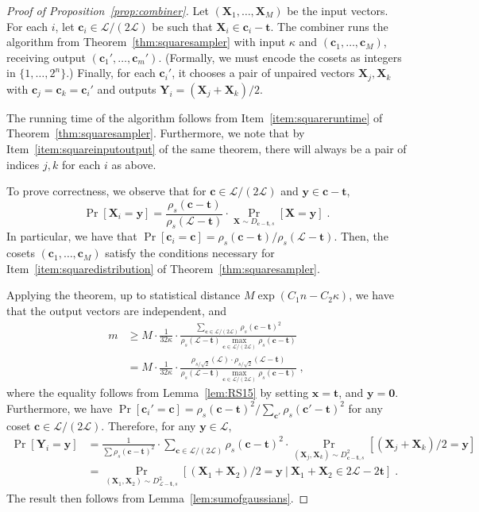 \documentclass[11pt]{article}
\renewcommand{\vec}[1]{\ensuremath{\mathbf{#1}}}
\newcommand{\coset}{\ensuremath{\vec{c}}}
\newcommand{\lat}{\mathcal{L}}
\begin{document}
\begin{proof}[Proof of Proposition~\ref{prop:combiner}]
Let $(\vec{X}_1, \ldots, \vec{X}_M)$ be the input vectors. 
For each $i$, let $\coset_i \in \lat/(2\lat)$ be such that $\vec{X}_i \in \coset_i - \vec{t}$. The combiner runs the algorithm from Theorem~\ref{thm:squaresampler} with input $\kappa$
and $(\coset_1,\ldots,\coset_M)$,
receiving output $(\coset_1', \ldots, \coset_m')$. 
(Formally, we must encode the cosets as integers in $\{1,\ldots, 2^n\}$.) Finally, for each $\coset_i'$, it chooses a pair of unpaired vectors $\vec{X}_j, \vec{X}_k$ with 
$\coset_j = \coset_k = \coset_i'$ and outputs $\vec{Y}_i = (\vec{X}_j + \vec{X}_k)/2$.

The running time of the algorithm follows from Item~\ref{item:squareruntime} of Theorem~\ref{thm:squaresampler}. Furthermore, we note that by Item~\ref{item:squareinputoutput} of the same theorem, there will always be a pair of indices $j,k$ for each $i$ as above.

To prove correctness, we observe that for $\coset \in \lat/(2\lat)$ and $\vec{y} \in \coset - \vec{t}$, 
\[ 
\Pr[\vec{X}_i = \vec{y}] = \frac{\rho_s(\coset - \vec{t})}{\rho_s(\lat - \vec{t})} \cdot \Pr_{\vec{X} \sim D_{\coset - \vec{t},s}}[\vec{X} = \vec{y}] \;.
\]
In particular, we have that $\Pr[\coset_i = \coset] = \rho_s(\coset-\vec{t})/\rho_s(\lat - \vec{t})$. 
Then, the cosets $(\coset_1,\ldots,\coset_M)$ satisfy the conditions necessary for Item~\ref{item:squaredistribution} of Theorem~\ref{thm:squaresampler}. 

Applying the theorem, up to statistical distance $M \exp(C_1 n - C_2 \kappa)$, we have that the output vectors are independent, and
\begin{align*}
m 
&\geq M \cdot \frac{1}{32\kappa }\cdot\frac{\sum_{\coset \in \lat/(2\lat)}\rho_s(\coset-\vec{t})^2}{\rho_s(\lat-\vec{t})\max_{\coset \in \lat / (2\lat)} \rho_s(\coset - \vec{t})} \\
&= M \cdot \frac{1}{32\kappa}\cdot\frac{\rho_{s/\sqrt{2}}(\lat) \cdot \rho_{s/\sqrt{2}}(\lat - \vec{t})}{ \rho_s(\lat-\vec{t})\max_{\coset \in \lat / (2\lat)} \rho_s(\coset - \vec{t})}
\; ,
\end{align*}
where the equality follows from Lemma~\ref{lem:RS15} by setting $\vec{x} = \vec{t}$, and $\vec{y} = \vec{0}$.
 Furthermore, we have $\Pr[\coset_i' = \coset] = \rho_s(\coset-\vec{t})^2/\sum_{\coset'} \rho_s(\coset' - \vec{t})^2$ for any coset $\coset \in \lat/(2\lat)$. Therefore, for any $\vec{y} \in \lat$, 
\begin{align*}
\Pr[\vec{Y}_i = \vec{y}] &= \frac{1}{\sum \rho_s(\coset - \vec{t})^2} \cdot \sum_{\coset \in \lat/(2\lat)} \rho_s(\coset-\vec{t})^2 \cdot \Pr_{(\vec{X}_j, \vec{X}_k) \sim D_{\coset-\vec{t}, s}^2}[(\vec{X}_j + \vec{X}_k)/2  = \vec{y}]\\
&= \Pr_{(\vec{X}_1, \vec{X}_2) \sim D_{\lat-\vec{t}, s}^2}[(\vec{X}_1 + \vec{X}_2)/2 = \vec{y} ~|~ \vec{X}_1 + \vec{X}_2 \in 2\lat - 2\vec{t}] 
\; .
\end{align*}
The result then follows from Lemma~\ref{lem:sumofgaussians}.
\end{proof}
 
\end{document}
